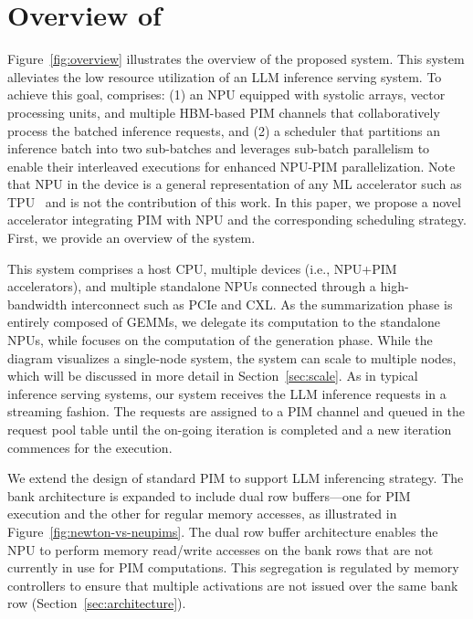 \section{Overview of \neupims}
\label{sec:neupims}

Figure~\ref{fig:overview} illustrates the overview of the proposed \neupims system.
%
This system alleviates the low resource utilization of an LLM inference serving system.
%
To achieve this goal, \neupims comprises: (1) an NPU equipped with systolic arrays, vector processing units, and multiple HBM-based PIM channels that collaboratively process the batched inference requests, and (2) a scheduler that partitions an inference batch into two sub-batches and leverages sub-batch parallelism to enable their interleaved executions for enhanced NPU-PIM parallelization. 
%
Note that NPU in the \neupims device is a general representation of any ML accelerator such as TPU~\cite{tpuv4} and is not the contribution of this work.
%
In this paper, we propose a novel accelerator integrating PIM with NPU and the corresponding scheduling strategy.
%
First, we provide an overview of the system. 
%

%
This system comprises a host CPU, multiple \neupims devices (i.e., NPU+PIM accelerators), and multiple standalone NPUs connected through a high-bandwidth interconnect such as PCIe and CXL.
%
As the summarization phase is entirely composed of GEMMs, we delegate its computation to the standalone NPUs, while \neupims focuses on the computation of the generation phase. 
%
While the diagram visualizes a single-node \neupims system, the system can scale to multiple nodes, which will be discussed in more detail in Section~\ref{sec:scale}.
%
As in typical inference serving systems, our system receives the LLM inference requests in a streaming fashion. 
%
The requests are assigned to a PIM channel and queued in the request pool table until the on-going iteration is completed and a new iteration commences for the execution. 

%
We extend the design of standard PIM to support \neupims LLM inferencing strategy. 
%
The bank architecture is expanded to include dual row buffers—one for PIM execution and the other for regular memory accesses, as illustrated in Figure~\ref{fig:newton-vs-neupims}.
%
The dual row buffer architecture enables the NPU to perform memory read/write accesses on the bank rows that are not currently in use for PIM computations. This segregation is regulated by memory controllers to ensure that multiple activations are not issued over the same bank row (Section~\ref{sec:architecture}).
%

